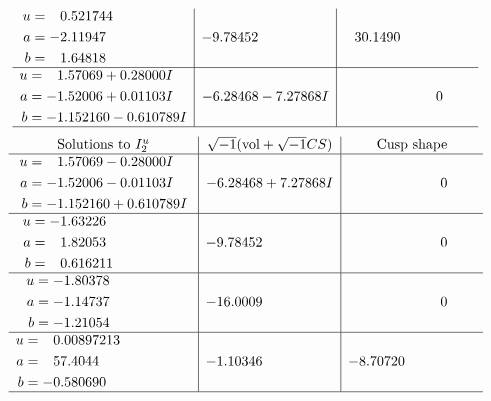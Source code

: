 \documentclass[1p]{elsarticle_modified}
\theoremstyle{definition}
\newcommand{\I}{\sqrt{-1}}
\begin{document}
$$\begin{array}{c|c|c}
\begin{aligned}
u &= \phantom{-}0.521744\phantom{ +0.000000I} \\
a &= -2.11947\phantom{ +0.000000I} \\
b &= \phantom{-}1.64818\phantom{ +0.000000I}\end{aligned}
 & -9.78452\phantom{ +0.000000I} & \phantom{-}30.1490\phantom{ +0.000000I} \\ \hline\begin{aligned}
u &= \phantom{-}1.57069 + 0.28000 I \\
a &= -1.52006 + 0.01103 I \\
b &= -1.152160 - 0.610789 I\end{aligned}
 & -6.28468 - 7.27868 I & \phantom{-0.000000 } 0\\
 \hline 
 \end{array}$$\newpage$$\begin{array}{c|c|c}  
\text{Solutions to }I^u_{2}& \I (\text{vol} + \sqrt{-1}CS) & \text{Cusp shape}\\
 \hline 
\begin{aligned}
u &= \phantom{-}1.57069 - 0.28000 I \\
a &= -1.52006 - 0.01103 I \\
b &= -1.152160 + 0.610789 I\end{aligned}
 & -6.28468 + 7.27868 I & \phantom{-0.000000 } 0 \\ \hline\begin{aligned}
u &= -1.63226\phantom{ +0.000000I} \\
a &= \phantom{-}1.82053\phantom{ +0.000000I} \\
b &= \phantom{-}0.616211\phantom{ +0.000000I}\end{aligned}
 & -9.78452\phantom{ +0.000000I} & \phantom{-0.000000 } 0 \\ \hline\begin{aligned}
u &= -1.80378\phantom{ +0.000000I} \\
a &= -1.14737\phantom{ +0.000000I} \\
b &= -1.21054\phantom{ +0.000000I}\end{aligned}
 & -16.0009\phantom{ +0.000000I} & \phantom{-0.000000 } 0 \\ \hline\begin{aligned}
u &= \phantom{-}0.00897213\phantom{ +0.000000I} \\
a &= \phantom{-}57.4044\phantom{ +0.000000I} \\
b &= -0.580690\phantom{ +0.000000I}\end{aligned}
 & -1.10346\phantom{ +0.000000I} & -8.70720\phantom{ +0.000000I}\\
 \hline 
 \end{array}$$\newpage\newpage\renewcommand{\arraystretch}{1}
\end{document}
